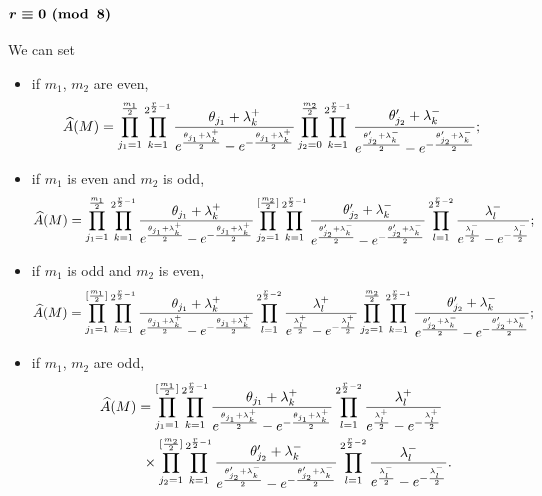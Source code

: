 \documentclass[pdftex]{sigma}
\newcommand{\A}{\mbox{$\widehat A$}}
\numberwithin{equation}{section}
\begin{document}
\subsubsection[$r\equiv 0 \,\,{\rm (mod\,\,\,8)}$]{$\boldsymbol{r\equiv 0 \,\,{\rm (mod\,\,\,8)}}$}
We can set
\begin{itemize}\itemsep=0pt
\item if $m_1$, $m_2$ are even,
\begin{gather*}
\A(M)
=\prod_{j_1=1}^{{m_1\over2}}\prod_{k=1}^{2^{{r\over 2}-1}}{\theta_{j_1}
+ \lambda_k^+\over e^{\theta_{j_1} + \lambda_k^+\over 2}
-e^{-{\theta_{j_1 }+ \lambda_k^+\over 2}}}
\prod_{j_2=0}^{{m_2\over 2}}\prod_{k=1}^{2^{{r\over 2}-1}}{\theta_{j_2}'
+ \lambda_{k}^-\over e^{\theta_{j_2}'
+ \lambda_{k}^-\over 2}
-e^{-{\theta_{j_2}' + \lambda_{k}^-\over 2}}};
\end{gather*}

\item if $m_1$ is even and $m_2$ is odd,
\begin{gather*}
\A(M)= \prod_{j_1=1}^{{m_1\over2}}\prod_{k=1}^{2^{{r\over 2}-1}}{\theta_{j_1}
+ \lambda_k^+\over e^{\theta_{j_1} + \lambda_k^+\over 2}
-e^{-{\theta_{j_1 }+ \lambda_k^+\over 2}}}
\prod_{j_2=1}^{[{m_2\over 2}]}\prod_{k=1}^{2^{{r\over 2}-1}}{\theta_{j_2}'
+ \lambda_{k}^-\over e^{\theta_{j_2}'
+ \lambda_{k}^-\over 2}
-e^{-{\theta_{j_2}' + \lambda_{k}^-\over 2}}}
\prod_{l=1}^{2^{{r\over 2}-2}} {\lambda_{l}^-\over e^{\lambda_{l}^-\over 2}
-e^{-{\lambda_{l}^-\over 2}}} ;
\end{gather*}

 \item if $m_1$ is odd and $m_2$ is even,
\begin{gather*}
\A(M) =\prod_{j_1=1}^{[{m_1\over2}]}\prod_{k=1}^{2^{{r\over 2}-1}}{\theta_{j_1}
+ \lambda_k^+\over e^{\theta_{j_1} + \lambda_k^+\over 2}
-e^{-{\theta_{j_1 }+ \lambda_k^+\over 2}}}
\prod_{l=1}^{2^{{r\over 2}-2}} {\lambda_{l}^+\over e^{\lambda_{l}^+\over 2}
-e^{-{\lambda_{l}^+\over 2}}}
\prod_{j_2=1}^{{m_2\over 2}}\prod_{k=1}^{2^{{r\over 2}-1}}{\theta_{j_2}'
+ \lambda_{k}^-\over e^{\theta_{j_2}'
+ \lambda_{k}^-\over 2}
-e^{-{\theta_{j_2}' + \lambda_{k}^-\over 2}}} ;
\end{gather*}

 \item if $m_1$, $m_2$ are odd,
\begin{gather*}
\A(M)
=\prod_{j_1=1}^{[{m_1\over2}]}\prod_{k=1}^{2^{{r\over 2}-1}}{\theta_{j_1}
+ \lambda_k^+\over e^{\theta_{j_1} + \lambda_k^+\over 2}
-e^{-{\theta_{j_1 }+ \lambda_k^+\over 2}}} \prod_{l=1}^{2^{{r\over 2}-2}} {\lambda_{l}^+\over e^{\lambda_{l}^+\over 2}
-e^{-{\lambda_{l}^+\over 2}}}\\
\hphantom{\A(M)=}{} \times
 \prod_{j_2=1}^{[{m_2\over 2}]}\prod_{k=1}^{2^{{r\over 2}-1}}{\theta_{j_2}'
+ \lambda_{k}^-\over e^{\theta_{j_2}'+ \lambda_{k}^-\over 2}-e^{-{\theta_{j_2}' + \lambda_{k}^-\over 2}}}\prod_{l=1}^{2^{{r\over 2}-2}} {\lambda_{l}^-\over e^{\lambda_{l}^-\over 2} -e^{-{\lambda_{l}^-\over 2}}} .
\end{gather*}
\end{itemize}
\end{document}

